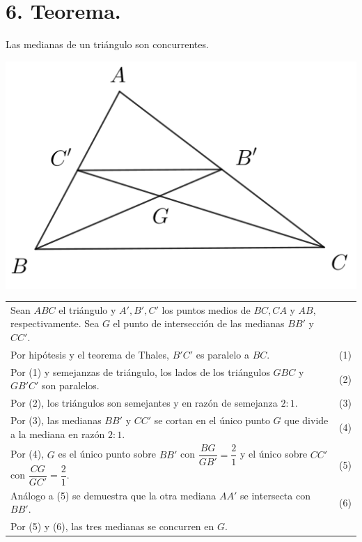 \documentclass[12pt,a4paper, oneside]{book}
\begin{document}
\section{6. Teorema.}
Las medianas de un triángulo son concurrentes.
\\
\begin{center}
\includegraphics[scale=0.8]{Imagenes/medianas.png} 
\end{center}
\begin{tabular}{p{15.9 cm} p{1cm}}
Sean $ABC$ el triángulo y $A', B', C'$ los puntos medios de $BC, CA$ y $AB$, respectivamente. Sea $G$ el punto de intersección de las medianas $BB'$ y $CC'$. 
\\Por hipótesis y el teorema de Thales, $B'C'$ es paralelo a $BC$. &(1)
\\Por (1) y semejanzas de triángulo, los lados de los triángulos $GBC$ y $GB'C'$ son paralelos. &(2)
\\Por (2), los triángulos son semejantes y en razón de semejanza $2:1.$ &(3)
\\Por (3), las medianas $BB'$  y $CC'$ se cortan en el único punto $G$ que divide a la mediana en razón $2:1$. &\medskip(4)
\\Por (4), $G$ es el único punto sobre $BB'$ con $\dfrac{BG}{GB'}=\dfrac{2}{1}$ y el único sobre $CC'$ con $\dfrac{CG}{GC'}=\dfrac{2}{1}$. &(5)
\\Análogo a (5) se demuestra que la otra mediana $AA'$ se intersecta con $BB'$. &(6)
\\Por (5) y (6), las tres medianas se concurren en $G$.
\end{tabular}
\end{document}
